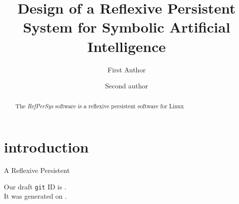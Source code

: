 \documentclass{svproc}
\begin{document}


\mainmatter              %
%
\title{Design of a Reflexive Persistent System for Symbolic Artificial Intelligence}
\author{First Author \and Second author}


\maketitle

\begin{abstract}
  The \textit{RefPerSys} software is a reflexive persistent software for Linux
\end{abstract}

\section{introduction}

A Reflexive Persistent

\begin{flushright}
  \begin{relsize}{-1}
    Our draft \texttt{git} ID is \texttt{\textit{\rpsgitcommit}}. \\
    It was generated on \texttt{\rpsdate}.
  \end{relsize}
\end{flushright}
\end{document}

